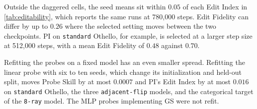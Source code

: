 \documentclass{article} %
\begin{document}
Outside the daggered cells, the seed means sit within $0.05$ of each Edit Index in \cref{tab:editability}, which reports the same runs at 780,000 steps. Edit Fidelity can differ by up to $0.26$ where the selected setting moves between the two checkpoints. PI on \texttt{standard} Othello, for example, is selected at a larger step size at 512,000 steps, with a mean Edit Fidelity of $0.48$ against $0.70$.

Refitting the probes on a fixed model has an even smaller spread. Refitting the linear probe with six to ten seeds, which change its initialization and held-out split, moves Probe Skill by at most $0.0007$ and PI's Edit Index by at most $0.016$ on \texttt{standard} Othello, the three \texttt{adjacent-flip} models, and the categorical target of the \texttt{8-ray} model. The MLP probes implementing GS were not refit.
\end{document}
